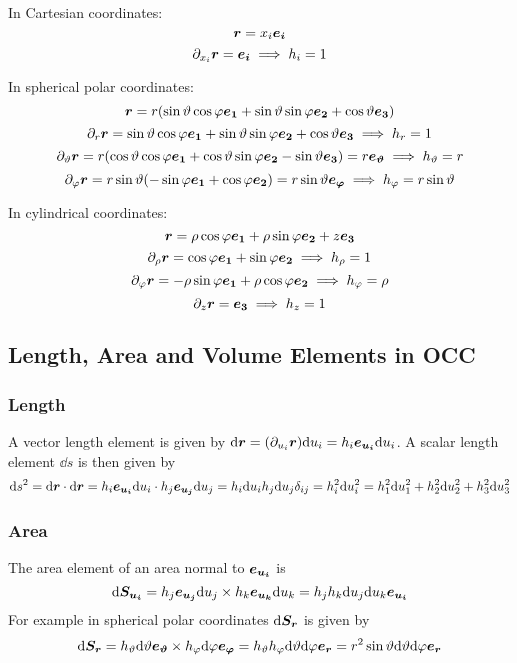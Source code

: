 \documentclass{article}
\newcommand{\pdvx}[1]{\partial_{x_{#1}}}
\begin{document}
    \example
    In Cartesian coordinates:
    \[\bm{r} = x_i\bm{e_{i}}\]
    \[\pdvx i\vv r = \ve i \implies h_i = 1\]
    
    \example
    In spherical polar coordinates:
    \[\bm{r} = r(\sin\vartheta\cos\varphi\bm{e_{1}} + \sin\vartheta\sin\varphi\bm{e_{2}} + \cos\vartheta\bm{e_{3}})\]
    \[\partial_r\bm{r} = \sin\vartheta\cos\varphi\bm{e_{1}} + \sin\vartheta\sin\varphi\bm{e_{2}} + \cos\vartheta\bm{e_{3}} \implies h_r = 1\]
    \[\partial_\vartheta \bm{r} = r(\cos\vartheta\cos\varphi\bm{e_{1}} + \cos\vartheta\sin\varphi\bm{e_{2}} - \sin\vartheta\bm{e_{3}}) = r\bm{e_{\vartheta}}\implies h_\vartheta = r\]
    \[\partial_\varphi\bm{r} = r\sin\vartheta(-\sin\varphi\bm{e_{1}} + \cos\varphi\bm{e_{2}}) = r\sin\vartheta\bm{e_{\varphi}}\implies h_\varphi = r\sin\vartheta\]
    
    \example
    In cylindrical coordinates:
    \[\bm{r} = \rho\cos\varphi\bm{e_{1}} + \rho\sin\varphi\bm{e_{2}} + z\bm{e_{3}}\]
    \[\partial_\rho\bm{r} = \cos\varphi\bm{e_{1}} + \sin\varphi\bm{e_{2}} \implies h_\rho = 1\]
    \[\partial_\varphi\bm{r} = -\rho\sin\varphi\bm{e_{1}} + \rho\cos\varphi\bm{e_{2}} \implies h_\varphi = \rho\]
    \[\partial_z\bm{r} = \bm{e_{3}}\implies h_z = 1\]
    
    
    \subsection{Length, Area and Volume Elements in OCC}
    \subsubsection{Length}
    A vector length element is given by \(\dd\bm{r} = (\partial_{u_i}\bm{r})\dd u_i = h_i\bm{e_{u_i}}\dd u_i\).
    A scalar length element \(\dd s\) is then given by
    \[\dd s^2 = \dd\bm{r}\cdot\dd\bm{r} = h_i\bm{e_{u_i}}\dd u_i\cdot h_j\bm{e_{u_j}}\dd u_j = h_i\dd u_i h_j\dd u_j\delta_{ij} = h_i^2\dd u_i^2 = h_1^2\dd u_1^2 + h_2^2\dd u_2^2 + h_3^2\dd u_3^2\]
    
    \subsubsection{Area}
    The area element of an area normal to \(\bm{e_{u_i}}\) is
    \[\dd\bm{S_{u_i}} = h_j\bm{e_{u_j}}\dd u_j\times h_k\bm{e_{u_k}}\dd u_k = h_jh_k\dd u_j\dd u_k\bm{e_{u_i}}\]
    For example in spherical polar coordinates \(\dd\bm{S_r}\) is given by
    \[\dd\bm{S_r} = h_\vartheta\dd\vartheta\bm{e_{\vartheta}}\times h_\varphi\dd\varphi\bm{e_{\varphi}} = h_\vartheta h_\varphi\dd\vartheta\dd\varphi\bm{e_{r}} = r^2\sin\vartheta\dd\vartheta\dd\varphi\bm{e_{r}}\]
    
\end{document}
